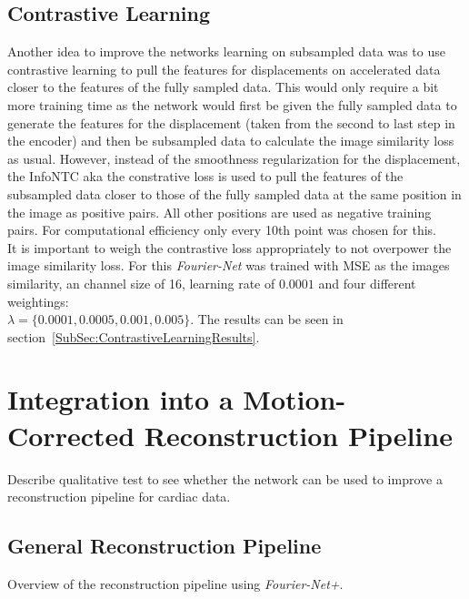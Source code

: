 \documentclass[english,version-2022-01]{uzl-thesis} %
\begin{document}
\subsection{Contrastive Learning} \label{SubSec:ContrastiveLearning}
Another idea to improve the networks learning on subsampled data was to use contrastive learning to pull the features for displacements on accelerated data closer to the features of the fully sampled data. This would only require a bit more training time as the network would first be given the fully sampled data to generate the features for the displacement (taken from the second to last step in the encoder) and then be subsampled data to calculate the image similarity loss as usual. However, instead of the smoothness regularization for the displacement, the InfoNTC aka the constrative loss is used to pull the features of the subsampled data closer to those of the fully sampled data at the same position in the image as positive pairs. All other positions are used as negative training pairs. For computational efficiency only every 10th point was chosen for this.\\
It is important to weigh the contrastive loss appropriately to not overpower the image similarity loss. For this \emph{Fourier-Net} was trained with MSE as the images similarity, an channel size of 16, learning rate of $0.0001$ and four different weightings: \\
$\lambda = \{0.0001, 0.0005, 0.001, 0.005\}$. The results can be seen in section~\ref{SubSec:ContrastiveLearningResults}.

\section{Integration into a Motion-Corrected Reconstruction Pipeline} \label{Sec:IntegrationMotion-CorrectedReconstructionPipeline}
Describe qualitative test to see whether the network can be used to improve a reconstruction pipeline for cardiac data.


\subsection{General Reconstruction Pipeline}
Overview of the reconstruction pipeline using \emph{Fourier-Net+}.
\end{document}
